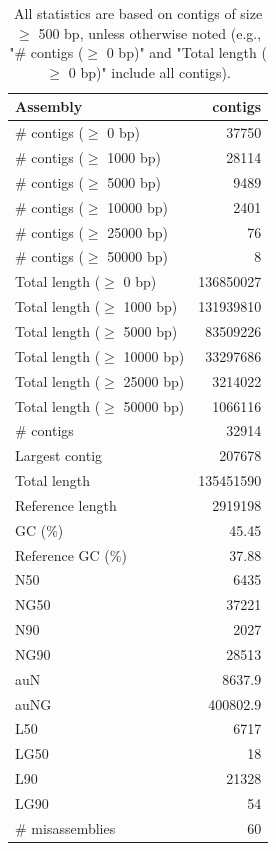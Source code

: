 \documentclass[12pt,a4paper]{article}
\begin{document}
\begin{table}[ht]
\begin{center}
\caption{All statistics are based on contigs of size $\geq$ 500 bp, unless otherwise noted (e.g., "\# contigs ($\geq$ 0 bp)" and "Total length ($\geq$ 0 bp)" include all contigs).}
\begin{tabular}{|l*{1}{|r}|}
\hline
Assembly & contigs \\ \hline
\# contigs ($\geq$ 0 bp) & 37750 \\ \hline
\# contigs ($\geq$ 1000 bp) & 28114 \\ \hline
\# contigs ($\geq$ 5000 bp) & 9489 \\ \hline
\# contigs ($\geq$ 10000 bp) & 2401 \\ \hline
\# contigs ($\geq$ 25000 bp) & 76 \\ \hline
\# contigs ($\geq$ 50000 bp) & 8 \\ \hline
Total length ($\geq$ 0 bp) & 136850027 \\ \hline
Total length ($\geq$ 1000 bp) & 131939810 \\ \hline
Total length ($\geq$ 5000 bp) & 83509226 \\ \hline
Total length ($\geq$ 10000 bp) & 33297686 \\ \hline
Total length ($\geq$ 25000 bp) & 3214022 \\ \hline
Total length ($\geq$ 50000 bp) & 1066116 \\ \hline
\# contigs & 32914 \\ \hline
Largest contig & 207678 \\ \hline
Total length & 135451590 \\ \hline
Reference length & 2919198 \\ \hline
GC (\%) & 45.45 \\ \hline
Reference GC (\%) & 37.88 \\ \hline
N50 & 6435 \\ \hline
NG50 & 37221 \\ \hline
N90 & 2027 \\ \hline
NG90 & 28513 \\ \hline
auN & 8637.9 \\ \hline
auNG & 400802.9 \\ \hline
L50 & 6717 \\ \hline
LG50 & 18 \\ \hline
L90 & 21328 \\ \hline
LG90 & 54 \\ \hline
\# misassemblies & 60 \\ \hline

\end{tabular}
\end{center}
\end{table}
\end{document}

